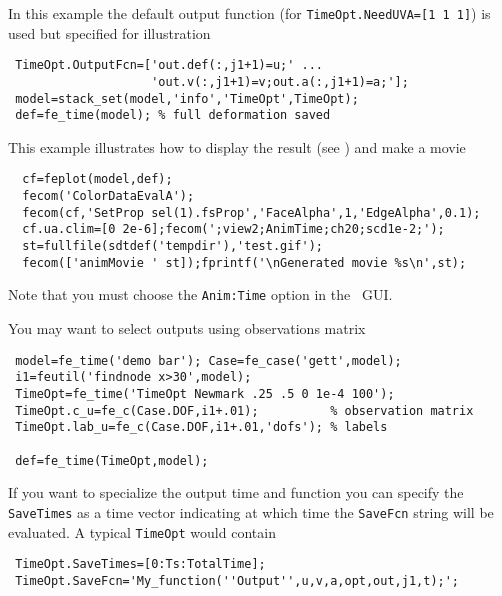 In this example the default output function (for {\tt TimeOpt.NeedUVA=[1 1 1]}) is used but specified for illustration 

\begin{verbatim}
 TimeOpt.OutputFcn=['out.def(:,j1+1)=u;' ...
                    'out.v(:,j1+1)=v;out.a(:,j1+1)=a;']; 
 model=stack_set(model,'info','TimeOpt',TimeOpt);
 def=fe_time(model); % full deformation saved
\end{verbatim}%


\begin{SDT}
This example illustrates how to display the result (see \feplot) and make a movie

\begin{verbatim}
  cf=feplot(model,def);
  fecom('ColorDataEvalA'); 
  fecom(cf,'SetProp sel(1).fsProp','FaceAlpha',1,'EdgeAlpha',0.1);
  cf.ua.clim=[0 2e-6];fecom(';view2;AnimTime;ch20;scd1e-2;');
  st=fullfile(sdtdef('tempdir'),'test.gif'); 
  fecom(['animMovie ' st]);fprintf('\nGenerated movie %s\n',st);
\end{verbatim}%


Note that you must choose the {\tt Anim:Time} option in the \feplot\ GUI.
\end{SDT}

You may want to select outputs using observations matrix
\begin{verbatim}
 model=fe_time('demo bar'); Case=fe_case('gett',model);
 i1=feutil('findnode x>30',model);
 TimeOpt=fe_time('TimeOpt Newmark .25 .5 0 1e-4 100');
 TimeOpt.c_u=fe_c(Case.DOF,i1+.01);          % observation matrix
 TimeOpt.lab_u=fe_c(Case.DOF,i1+.01,'dofs'); % labels
 
 def=fe_time(TimeOpt,model);
\end{verbatim}%


If you want to specialize the output time and function you can specify the {\tt SaveTimes} as a time vector indicating at which time the {\tt SaveFcn} string will be evaluated. 
A typical {\tt TimeOpt} would contain

\begin{verbatim}
 TimeOpt.SaveTimes=[0:Ts:TotalTime];
 TimeOpt.SaveFcn='My_function(''Output'',u,v,a,opt,out,j1,t);';
\end{verbatim}



